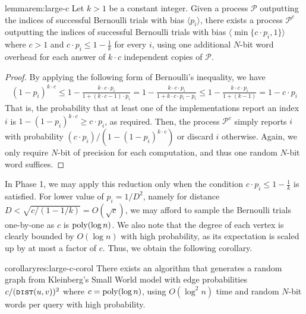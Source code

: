 \begin{restatable}{lemma}{rem:large-c}
Let $k>1$ be a constant integer. Given a process $\mathcal{P}$ outputting the indices of successful Bernoulli trials with bias $\langle p_i\rangle$, there exists a process $\mathcal{P}^c$ outputting the indices of successful Bernoulli trials with bias $\langle \min\{c\cdot p_i, 1\}\rangle$ where $c>1$ and $c \cdot p_i \leq 1-\frac{1}{k}$ for every $i$,
using one additional $N$-bit word overhead for each answer of $k\cdot c$ independent copies of $\mathcal{P}$.
\end{restatable}
\begin{proof}
By applying the following form of Bernoulli's inequality, we have
\begin{align*}
(1-p_{i})^{k\cdot c} \leq 1-\frac{k\cdot c\cdot p_{i}}{1+(k\cdot c-1)\cdot p_{i}}
= 1-\frac{k\cdot c\cdot p_{i}}{1+k\cdot c\cdot p_{i}-p_{i}}
\leq 1-\frac{k\cdot c\cdot p_{i}}{1+(k-1)} = 1-c\cdot p_{i}
\end{align*}
That is, the probability that at least one of the implementations report an index $i$ is $1-(1-p_{i})^{k\cdot c} \geq c\cdot p_i$, as required.
Then, the process $\mathcal{P}^c$ simply reports $i$ with probability $(c\cdot p_i) / (1-(1-p_{i})^{k\cdot c})$ or discard $i$ otherwise.
Again, we only require $N$-bit of precision for each computation, and thus one random $N$-bit word suffices.
\end{proof}

In Phase 1, we may apply this reduction only when the condition $c \cdot p_i \leq 1-\frac{1}{k}$ is satisfied.
For lower value of $p_i = 1/D^2$, namely for distance $D < \sqrt{c/(1-1/k)} = O(\sqrt{c})$, we may afford to sample the Bernoulli trials one-by-one as $c$ is $\mathrm{poly}(\log n)$.
We also note that the degree of each vertex is clearly bounded by $O(\log n)$ with high probability, as its expectation is scaled up by at most a factor of $c$.
Thus, we obtain the following corollary.
\begin{restatable}{corollary}{res:large-c-corol}
There exists an algorithm that generates a random graph from Kleinberg's Small World model with edge probabilities $c/(\texttt{\textsc{dist}}(u,v))^2$ where $c = \mathrm{poly}(\log n)$,
using $O(\log^2 n)$ time and random $N$-bit words per  query with high probability.
\end{restatable}

